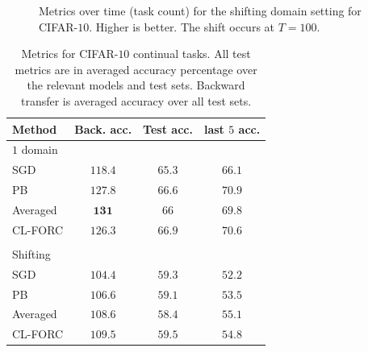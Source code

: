\documentclass{article}
\theoremstyle{plain}
\theoremstyle{definition}
\theoremstyle{remark}
\begin{document}
\begin{figure}[ht!]
\vskip 0.2in
\centering


\caption{Metrics over time (task count) for the shifting domain setting for CIFAR-$10$. Higher is better. The shift occurs at $T=100$.}
\label{cifar-shift}
\vskip -0.2in
\end{figure}

\begin{table}[t]
\caption{Metrics for CIFAR-$10$ continual tasks. All test metrics are in averaged accuracy percentage over the relevant models and test sets. Backward transfer is averaged accuracy over all test sets.}
\label{cifar-full-table}
\vskip 0.15in
\begin{center}
\begin{small}
\begin{sc}
\begin{tabular}{lccc}
\toprule
Method & Back. acc. & Test acc. & last $5$ acc. \\
\midrule
$1$ domain & & & \\
\midrule
SGD    & $118.4$ & $65.3$ & $66.1$ \\
PB & $127.8$ & $66.6$ & $\mathbf{70.9}$\\
Averaged    & $\mathbf{131}$ & $66$ & $69.8$ \\
CL-FORC    & $126.3$& $\mathbf{66.9}$ & $70.6$        \\

\\ Shifting & & & \\
\midrule
SGD    & $104.4$ & $59.3$ & $52.2$ \\
PB & $106.6$ & $59.1$ & $53.5$\\
Averaged    & $108.6$ & $58.4$ & $\mathbf{55.1}$ \\
CL-FORC   & $\mathbf{109.5}$& $\mathbf{59.5}$ & $54.8$        \\
\bottomrule
\end{tabular}
\end{sc}
\end{small}
\end{center}
\vskip -0.1in
\end{table}
\end{document}
